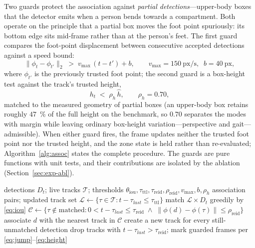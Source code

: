 \documentclass[journal,article,submit,oneauthor]{Definitions/mdpi}
\begin{document}
Two guards protect the association against \emph{partial detections}---upper-body boxes that
the detector emits when a person bends towards a compartment. Both operate on the principle
that a partial box moves the foot point spuriously: its bottom edge sits mid-frame rather
than at the person's feet. The first guard compares the foot-point displacement between
consecutive accepted detections against a speed bound:
\begin{equation}
\label{eq:jump}
\bigl\|\phi_t-\phi_{t'}\bigr\|_2 \;>\; v_{\max}\,(t-t') + b,
\qquad v_{\max}=150~\mathrm{px/s},\;\; b=40~\mathrm{px},
\end{equation}
where $\phi_{t'}$ is the previously trusted foot point; the second guard is a box-height
test against the track's trusted height,
\begin{equation}
\label{eq:height}
h_t \;<\; \rho_h\,\hat{h}, \qquad \rho_h = 0.70 ,
\end{equation}
matched to the measured geometry of partial boxes (an upper-body box retains roughly
$47$~\% of the full height on the benchmark, so $0.70$ separates the modes with margin while
leaving ordinary box-height variation---perspective and gait---admissible). When either guard
fires, the frame updates neither the trusted foot point nor the trusted height, and the zone
state is held rather than re-evaluated; Algorithm~\ref{alg:assoc} states the complete
procedure. The guards are pure functions with unit tests, and their contributions are
isolated by the ablation (Section~\ref{sec:exp-abl}).

\begin{algorithm}[H]
\caption{Two-stage track association with geometric guards (per frame).}
\label{alg:assoc}
\begin{algorithmic}[1]
\Require detections $D_t$; live tracks $\mathcal{T}$; thresholds $\theta_{\mathrm{iou}},
\tau_{\mathrm{ttl}}, \tau_{\mathrm{reid}}, \rho_{\mathrm{reid}}, v_{\max}, b, \rho_h$
\Ensure association pairs; updated track set
\State $\mathcal{L} \gets \{\tau \in \mathcal{T} : t-\tau_{last} \le \tau_{\mathrm{ttl}}\}$
\State match $\mathcal{L} \times D_t$ greedily by \eqref{eq:iou} 
  \State $\mathcal{C} \gets \{\tau \notin \text{matched}: 0 < t-\tau_{last} \le
    \tau_{\mathrm{reid}} \;\wedge\; \|\phi(d)-\phi(\tau)\| \le \rho_{\mathrm{reid}}\}$
   associate $d$ with the nearest track in $\mathcal{C}$
  \EndIf
\EndFor
\State create a new track for every still-unmatched detection
\State drop tracks with $t-\tau_{last} > \tau_{\mathrm{reid}}$; mark guarded frames per
       \eqref{eq:jump}--\eqref{eq:height}
\end{algorithmic}
\end{algorithm}
\end{document}
